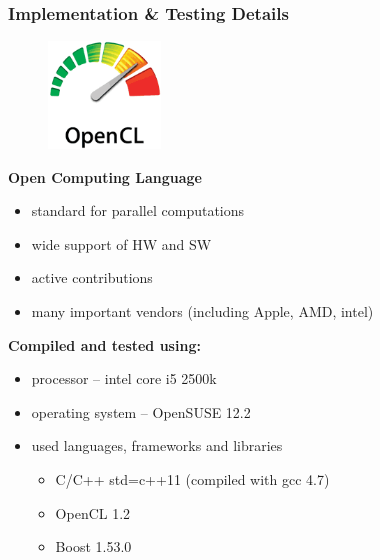 \documentclass[10pt, xcolor=pdflatex, dvipsnames, table]{beamer}
\begin{document}
\begin{frame}
\frametitle{Implementation \& Testing Details}
\begin{figure}
\includegraphics[width=3cm]{img/OpenCL_Logo.png}
\end{figure}
\textbf{Open Computing Language} 
\begin{itemize}
\item standard for parallel computations
\item wide support of HW and SW
\item active contributions 
\item many important vendors (including Apple, AMD, intel)
\end{itemize} 

\vspace{1em}

\textbf{Compiled and tested using:}
\begin{itemize}
\item processor -- intel core i5 2500k
\item operating system -- OpenSUSE 12.2
\item used languages, frameworks and libraries 
  \begin{itemize}
  \item C/C++ std=c++11 (compiled with gcc 4.7)
  \item OpenCL 1.2
  \item Boost 1.53.0
  \end{itemize}
\end{itemize}
\end{frame}
\end{document}
